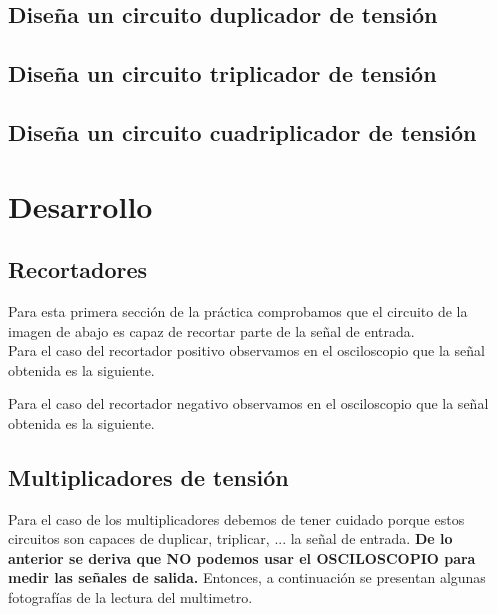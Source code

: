\documentclass{mylib/reporteConCalif}
\begin{document}
\subsection{Diseña un circuito duplicador de tensión}


\subsection{Diseña un circuito triplicador de tensión}


\subsection{Diseña un circuito cuadriplicador de tensión}


\newpage
\section{Desarrollo}

\subsection{Recortadores}

Para esta primera sección de la práctica comprobamos que el circuito de la imagen de abajo es capaz de recortar parte
de la señal de entrada. \\

Para el caso del recortador positivo observamos en el osciloscopio que la señal obtenida es la siguiente.


Para el caso del recortador negativo observamos en el osciloscopio que la señal obtenida es la siguiente.


\subsection{Multiplicadores de tensión}

Para el caso de los multiplicadores debemos de tener cuidado porque estos circuitos son capaces de duplicar, triplicar, ... la señal
de entrada. \textbf{De lo anterior se deriva que NO podemos usar el OSCILOSCOPIO para medir las señales de salida.} Entonces, a continuación
se presentan algunas fotografías de la lectura del multimetro.
\end{document}
